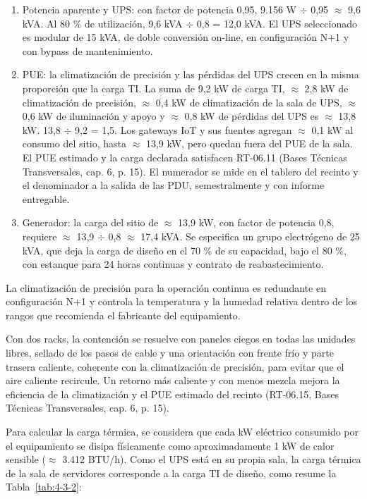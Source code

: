 \begin{enumerate}
  \item Potencia aparente y UPS: con factor de potencia 0,95, 9.156 W $\div$ 0,95 $\approx$ 9,6 kVA. Al 80 \% de utilización, 9,6 kVA $\div$ 0,8 = 12,0 kVA. El UPS seleccionado es modular de 15 kVA, de doble conversión on-line, en configuración N+1 y con bypass de mantenimiento.
  \item PUE: la climatización de precisión y las pérdidas del UPS crecen en la misma proporción que la carga TI. La suma de 9,2 kW de carga TI, $\approx$ 2,8 kW de climatización de precisión, $\approx$ 0,4 kW de climatización de la sala de UPS, $\approx$ 0,6 kW de iluminación y apoyo y $\approx$ 0,8 kW de pérdidas del UPS es $\approx$ 13,8 kW. 13,8 $\div$ 9,2 = 1,5. Los gateways IoT y sus fuentes agregan $\approx$ 0,1 kW al consumo del sitio, hasta $\approx$ 13,9 kW, pero quedan fuera del PUE de la sala. El PUE estimado y la carga declarada satisfacen RT-06.11 (Bases Técnicas Transversales, cap. 6, p. 15). El numerador se mide en el tablero del recinto y el denominador a la salida de las PDU, semestralmente y con informe entregable.
  \item Generador: la carga del sitio de $\approx$ 13,9 kW, con factor de potencia 0,8, requiere $\approx$ 13,9 $\div$ 0,8 $\approx$ 17,4 kVA. Se especifica un grupo electrógeno de 25 kVA, que deja la carga de diseño en el 70 \% de su capacidad, bajo el 80 \%, con estanque para 24 horas continuas y contrato de reabastecimiento.
\end{enumerate}

La climatización de precisión para la operación continua es redundante en configuración N+1 y controla la temperatura y la humedad relativa dentro de los rangos que recomienda el fabricante del equipamiento.

Con dos racks, la contención se resuelve con paneles ciegos en todas las unidades libres, sellado de los pasos de cable y una orientación con frente frío y parte trasera caliente, coherente con la climatización de precisión, para evitar que el aire caliente recircule. Un retorno más caliente y con menos mezcla mejora la eficiencia de la climatización y el PUE estimado del recinto (RT-06.15, Bases Técnicas Transversales, cap. 6, p. 15).

Para calcular la carga térmica, se considera que cada kW eléctrico consumido por el equipamiento se disipa físicamente como aproximadamente 1 kW de calor sensible ($\approx$ 3.412 BTU/h). Como el UPS está en su propia sala, la carga térmica de la sala de servidores corresponde a la carga TI de diseño, como resume la Tabla~\ref{tab:4-3-2}:

